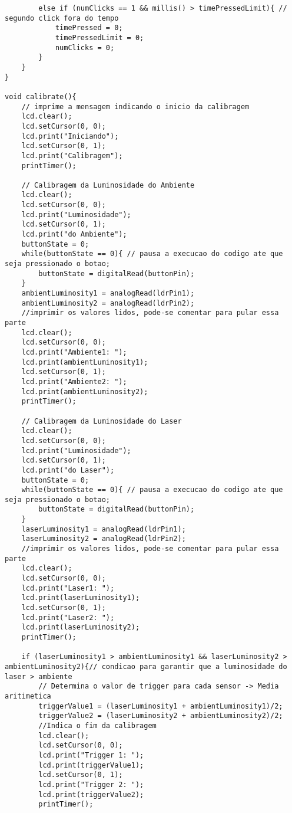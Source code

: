 \documentclass[10pt,twocolumn,letterpaper]{article}
\begin{document}
\begin{lstlisting}
        else if (numClicks == 1 && millis() > timePressedLimit){ // segundo click fora do tempo 
            timePressed = 0;
            timePressedLimit = 0;
            numClicks = 0;
        }
    }
}

void calibrate(){
    // imprime a mensagem indicando o inicio da calibragem
    lcd.clear();
    lcd.setCursor(0, 0);
    lcd.print("Iniciando");
    lcd.setCursor(0, 1);
    lcd.print("Calibragem");
    printTimer();

    // Calibragem da Luminosidade do Ambiente
    lcd.clear();
    lcd.setCursor(0, 0);
    lcd.print("Luminosidade");
    lcd.setCursor(0, 1);
    lcd.print("do Ambiente");
    buttonState = 0;
    while(buttonState == 0){ // pausa a execucao do codigo ate que seja pressionado o botao;
        buttonState = digitalRead(buttonPin);
    }
    ambientLuminosity1 = analogRead(ldrPin1);
    ambientLuminosity2 = analogRead(ldrPin2);
    //imprimir os valores lidos, pode-se comentar para pular essa parte
    lcd.clear();
    lcd.setCursor(0, 0);
    lcd.print("Ambiente1: ");
    lcd.print(ambientLuminosity1);
    lcd.setCursor(0, 1);
    lcd.print("Ambiente2: ");
    lcd.print(ambientLuminosity2);
    printTimer();
    
    // Calibragem da Luminosidade do Laser
    lcd.clear();
    lcd.setCursor(0, 0);
    lcd.print("Luminosidade");
    lcd.setCursor(0, 1);
    lcd.print("do Laser");
    buttonState = 0;
    while(buttonState == 0){ // pausa a execucao do codigo ate que seja pressionado o botao;
        buttonState = digitalRead(buttonPin);
    }
    laserLuminosity1 = analogRead(ldrPin1);
    laserLuminosity2 = analogRead(ldrPin2);
    //imprimir os valores lidos, pode-se comentar para pular essa parte
    lcd.clear();
    lcd.setCursor(0, 0);
    lcd.print("Laser1: ");
    lcd.print(laserLuminosity1);
    lcd.setCursor(0, 1);
    lcd.print("Laser2: ");
    lcd.print(laserLuminosity2);
    printTimer();

    if (laserLuminosity1 > ambientLuminosity1 && laserLuminosity2 > ambientLuminosity2){// condicao para garantir que a luminosidade do laser > ambiente
        // Determina o valor de trigger para cada sensor -> Media aritimetica
        triggerValue1 = (laserLuminosity1 + ambientLuminosity1)/2;
        triggerValue2 = (laserLuminosity2 + ambientLuminosity2)/2;
        //Indica o fim da calibragem
        lcd.clear();
        lcd.setCursor(0, 0);
        lcd.print("Trigger 1: ");
        lcd.print(triggerValue1);
        lcd.setCursor(0, 1);
        lcd.print("Trigger 2: ");
        lcd.print(triggerValue2);
        printTimer();


\end{lstlisting}
\end{document}

